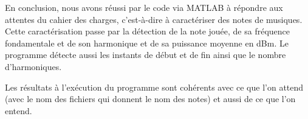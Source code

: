 En conclusion, nous avons réussi par le code via MATLAB à répondre aux attentes du cahier des charges, c'est-à-dire à caractériser des notes de musiques. Cette caractérisation passe par la détection de la note jouée, de sa fréquence fondamentale et de son harmonique et de sa puissance moyenne en dBm. Le programme détecte aussi les instants de début et de fin ainsi que le nombre d'harmoniques.

Les résultats à l'exécution du programme sont cohérents avec ce que l'on attend (avec le nom des fichiers qui donnent le nom des notes) et aussi de ce que l'on entend.